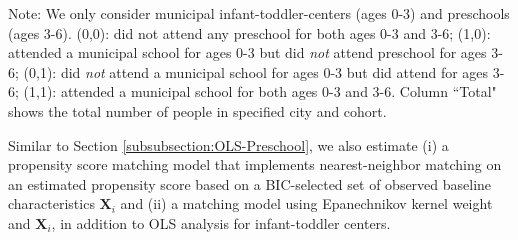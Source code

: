 \begin{table}[H] \caption{Number of Individuals in Each Group} \label{tab:num-group-2}
\begin{flushleft}
\footnotesize{Note:} We only consider municipal infant-toddler-centers (ages 0-3) and preschools (ages 3-6). (0,0): did not attend any preschool for both ages 0-3 and 3-6; (1,0): attended a municipal school for ages 0-3 but did \textit{not} attend preschool for ages 3-6; (0,1): did \textit{not} attend a municipal school for ages 0-3 but did attend for ages 3-6; (1,1): attended a municipal school for both ages 0-3 and 3-6. Column ``Total" shows the total number of people in specified city and cohort.
\end{flushleft}
\end{table}

Similar to Section \ref{subsubsection:OLS-Preschool}, we also estimate (i) a propensity score matching model that implements nearest-neighbor matching on an estimated propensity score based on a BIC-selected set of observed baseline characteristics $\boldsymbol{X}_i$ and (ii) a matching model using Epanechnikov kernel weight and $\boldsymbol{X}_i$, in addition to OLS analysis for infant-toddler centers. 

